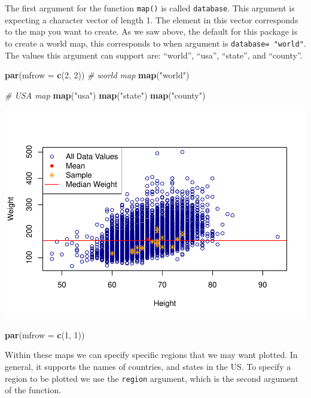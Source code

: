 \documentclass[
]{book}
\newenvironment{Shaded}{\begin{snugshade}}{\end{snugshade}}
\newcommand{\CommentTok}[1]{\textcolor[rgb]{0.56,0.35,0.01}{\textit{#1}}}
\newcommand{\DataTypeTok}[1]{\textcolor[rgb]{0.13,0.29,0.53}{#1}}
\newcommand{\DecValTok}[1]{\textcolor[rgb]{0.00,0.00,0.81}{#1}}
\newcommand{\KeywordTok}[1]{\textcolor[rgb]{0.13,0.29,0.53}{\textbf{#1}}}
\newcommand{\NormalTok}[1]{#1}
\newcommand{\StringTok}[1]{\textcolor[rgb]{0.31,0.60,0.02}{#1}}
\begin{document}
The first argument for the function \texttt{map()} is called \texttt{database}. This argument is expecting a character vector of length 1. The element in this vector corresponds to the map you want to create. As we saw above, the default for this package is to create a world map, this corresponds to when argument is \texttt{database=\ "world"}. The values this argument can support are: ``world'', ``usa'', ``state'', and ``county''.

\begin{Shaded}
\begin{Highlighting}[]
\KeywordTok{par}\NormalTok{(}\DataTypeTok{mfrow =} \KeywordTok{c}\NormalTok{(}\DecValTok{2}\NormalTok{, }\DecValTok{2}\NormalTok{))}
\CommentTok{# world map}
\KeywordTok{map}\NormalTok{(}\StringTok{"world"}\NormalTok{)}

\CommentTok{# USA map}
\KeywordTok{map}\NormalTok{(}\StringTok{"usa"}\NormalTok{)}
\KeywordTok{map}\NormalTok{(}\StringTok{"state"}\NormalTok{)}
\KeywordTok{map}\NormalTok{(}\StringTok{"county"}\NormalTok{)}
\end{Highlighting}
\end{Shaded}

\includegraphics{_main_files/figure-latex/unnamed-chunk-192-1.pdf}

\begin{Shaded}
\begin{Highlighting}[]
\KeywordTok{par}\NormalTok{(}\DataTypeTok{mfrow =} \KeywordTok{c}\NormalTok{(}\DecValTok{1}\NormalTok{, }\DecValTok{1}\NormalTok{))}
\end{Highlighting}
\end{Shaded}

Within these maps we can specify specific regions that we may want plotted. In general, it supports the names of countries, and states in the US. To specify a region to be plotted we use the \texttt{region} argument, which is the second argument of the function.
\end{document}
